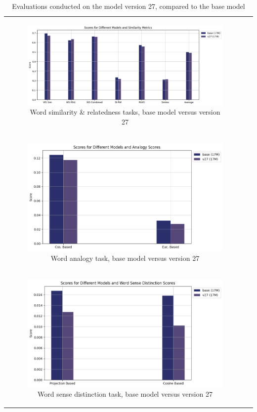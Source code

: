\begin{table}[p]
  \centering
  \begin{tabular}{cc}
    \begin{subfigure}{0.9\textwidth}
      \includegraphics[width=\linewidth]{img/sim_v27.png}
      \caption{Word similarity \& relatedness tasks, base model versus version 27}
    \end{subfigure} \\
    \begin{subfigure}{0.8\textwidth}
      \includegraphics[width=\linewidth]{img/analogy_v27.png}
      \caption{Word analogy task, base model versus version 27}
    \end{subfigure} \\
    \begin{subfigure}{0.8\textwidth}
      \includegraphics[width=\linewidth]{img/wsd_v27.png}
      \caption{Word sense distinction task, base model versus version 27}
    \end{subfigure}
  \end{tabular}
  \caption{Evaluations conducted on the model version 27, compared to the base model}
  \label{tab:basev27}
\end{table}

